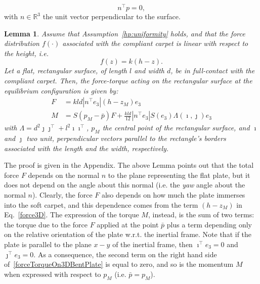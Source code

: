 \documentclass[12pt,a4paper,twoside]{article}
\newtheorem{boldLemma}{\bf{Lemma}}
\begin{document}
\begin{equation}
\label{distributionPlane}
n^\top p = 0,
\end{equation} 
with $n \in \mathbb{R}^3$ the unit vector perpendicular to the  surface.

\begin{boldLemma}
\label{lemma3D}
Assume that Assumption~\ref{hp:uniformity} holds, and that the force distribution $f(\cdot)$ associated with the compliant carpet  is linear with respect to the height, i.e.
\begin{equation}
\label{distributionLinear3D}
f(z) = k(h-z).
\end{equation}
Let a flat, rectangular surface, of length $l$ and width $d$, be in full-contact with the compliant carpet. Then, the force-torque acting on the  rectangular surface at the equilibrium configuration is given by: 
\begin{subequations}
\label{forceTorqueOn3DBentPlate}
    \begin{alignat}{2}
\label{force3D}
F &= kld|n^\top e_3|\left(h-z_M \right)e_3 \\
\label{torque3D}
M &= S(p_M - \bar{p})F + \frac{kld}{12}|n^\top e_3|S(e_3)\Lambda(\imath,\jmath)e_3 
    \end{alignat}
\end{subequations}
with 
$\Lambda = d^2 \jmath \jmath^\top + l^2 \imath \imath^\top$,
 $p_M$  the central point of the rectangular surface,  
and $\imath$ and 
$\jmath$ two unit, perpendicular vectors parallel to the rectangle's borders associated with the length and the width, respectively.
\end{boldLemma}

The proof is given in the Appendix. The above Lemma points out that the total force $F$ depends on the normal $n$ to the plane representing the flat plate, but it does not depend on the angle about this normal (i.e. the \emph{yaw} angle about the normal $n$). Clearly, the force $F$ also depends on how much the  plate immerses into the soft carpet, and this dependence comes from the term $(h-z_M)$ in Eq.~\eqref{force3D}. The expression of the torque $M$, instead, is the sum of two terms: the torque due to the force $F$ applied at the point  $\bar{p}$ plus a term  depending only on the relative orientation of the plate w.r.t. the inertial frame. Note that if the plate is parallel to the plane $x-y$ of the inertial frame, then $\imath^\top e_3 = 0$ and 
$\jmath^\top e_3 = 0$. As a consequence, the second term on the right hand side of~\eqref{forceTorqueOn3DBentPlate} is equal to zero, and so is the momentum $M$ when expressed with respect to $p_M$ (i.e. $\bar{p}=p_M$). 
\end{document}
